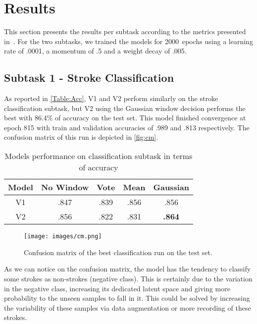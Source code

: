 \documentclass[
]{ceurart}
\begin{document}
\section{Results}

This section presents the results per subtask according to the metrics presented in~\cite{mediaeval/Martin/2022/overview}. For the two subtasks, we trained the models for 2000~epochs using a learning rate of .0001, a momentum of .5 and a weight decay of .005.



\subsection{Subtask 1 - Stroke Classification}

As reported in \autoref{Table:Acc}, V1 and V2 perform similarly on the stroke classification subtask, but V2 using the Gaussian window decision performs the best with 86.4\% of accuracy on the test set. This model finished convergence at epoch 815 with train and validation accuracies of .989 and .813 respectively. The confusion matrix of this run is depicted in \autoref{fig:cm}.



\begin{table}
\caption{Models performance on classification subtask in terms of accuracy}
  \label{Table:Acc}
    \begin{tabular}{|c|c|c|c|c|}
    \toprule
        Model & No Window & Vote & Mean & Gaussian \\ \midrule
        V1 & .847 & .839 & .856 & .856 \\ \midrule
        V2 & .856 & .822 & .831 & \textbf{.864} \\ \bottomrule
    \end{tabular}
\end{table}

\begin{figure}
\centering
    \texttt{[image: images/cm.png]}
    \caption{Confusion matrix of the best classification run on the test set.}
    \label{fig:cm}
\end{figure}

As we can notice on the confusion matrix, the model has the tendency to classify some strokes as non-strokes (negative class). This is certainly due to the variation in the negative class, increasing its dedicated latent space and giving more probability to the unseen samples to fall in it. This could be solved by increasing the variability of these samples via data augmentation or more recording of these strokes.
\end{document}
